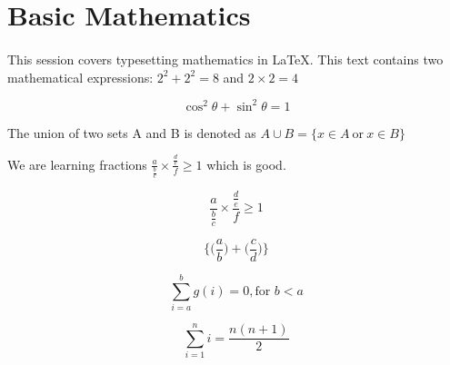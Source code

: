 \documentclass{article}
\begin{document}
	\section{Basic Mathematics}
    \paragraph{}
    This session covers typesetting mathematics in LaTeX. This text contains two mathematical expressions: 
    $ 2^{2} + 2^{2} = 8$ and $ 2 \times 2 = 4$

    \[ \cos^2 \theta + \sin^2 \theta = 1\]
    
    The union of two sets A and B is denoted as 
    $ A \cup B = \{ x \in A \ \text{or} \ x \in B \} $
    
    We are learning fractions $ \frac{a}{\frac{b}{c}} \times \frac{\frac{d}{e}}{f} \geq 1$ which is good.

    \[ \frac{a}{\frac{b}{c}} \times \frac{\frac{d}{e}}{f} \geq 1\]

    \[ \Bigg\{ \bigg(\frac{a}{b}\bigg) + \bigg(\frac{c}{d}\bigg)\Bigg\} \]

    \[ \sum_{i=a}^{b} g(i) = 0, \text{for } b < a \]

    \[ \sum_{i=1}^{n} i = \frac{n(n+1)}{2} \]
\end{document}
